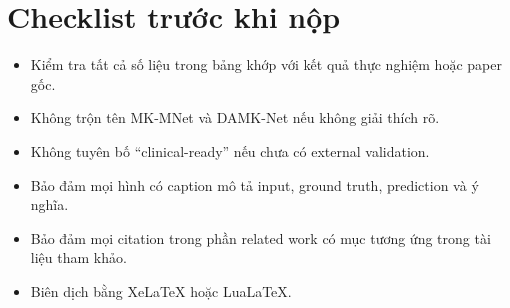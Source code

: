 \documentclass[12pt,a4paper,oneside]{report}
\begin{document}
\chapter{Checklist trước khi nộp}

\begin{itemize}
  \item Kiểm tra tất cả số liệu trong bảng khớp với kết quả thực nghiệm hoặc paper gốc.
  \item Không trộn tên MK-MNet và DAMK-Net nếu không giải thích rõ.
  \item Không tuyên bố ``clinical-ready'' nếu chưa có external validation.
  \item Bảo đảm mọi hình có caption mô tả input, ground truth, prediction và ý nghĩa.
  \item Bảo đảm mọi citation trong phần related work có mục tương ứng trong tài liệu tham khảo.
  \item Biên dịch bằng XeLaTeX hoặc LuaLaTeX.
\end{itemize}
\end{document}
